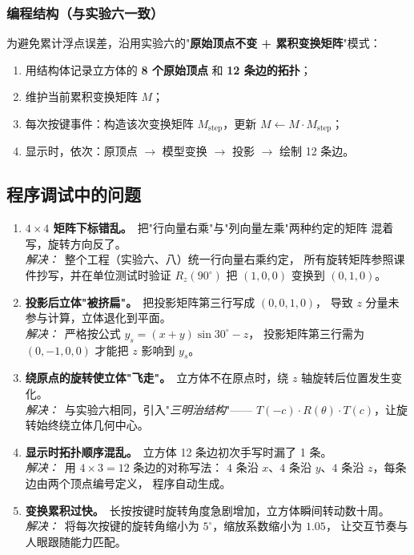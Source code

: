 \documentclass[a4paper,12pt]{ctexart}
\begin{document}
\subsubsection{编程结构（与实验六一致）}

为避免累计浮点误差，沿用实验六的"\textbf{原始顶点不变 + 累积变换矩阵}"模式：

\begin{enumerate}[leftmargin=2em,itemsep=0.2em]
    \item 用结构体记录立方体的 \textbf{8 个原始顶点} 和 \textbf{12 条边的拓扑}；
    \item 维护当前累积变换矩阵 $M$；
    \item 每次按键事件：构造该次变换矩阵 $M_\text{step}$，更新 $M \leftarrow M\cdot M_\text{step}$；
    \item 显示时，依次：原顶点 $\to$ 模型变换 $\to$ 投影 $\to$ 绘制 12 条边。
\end{enumerate}

\subsection{程序调试中的问题}

\begin{enumerate}[leftmargin=2em,itemsep=0.4em]
    \item \textbf{$4\times 4$ 矩阵下标错乱。}\ 把"行向量右乘"与"列向量左乘"两种约定的矩阵
        混着写，旋转方向反了。\\
        \textit{解决：}\ 整个工程（实验六、八）统一行向量右乘约定，
        所有旋转矩阵参照课件抄写，并在单位测试时验证 $R_z(90^\circ)$ 把 $(1,0,0)$
        变换到 $(0,1,0)$。

    \item \textbf{投影后立体"被挤扁"。}\ 把投影矩阵第三行写成 $(0,0,1,0)$，
        导致 $z$ 分量未参与计算，立体退化到平面。\\
        \textit{解决：}\ 严格按公式 $y_s=(x+y)\sin30^\circ - z$，
        投影矩阵第三行需为 $(0,-1,0,0)$ 才能把 $z$ 影响到 $y_s$。

    \item \textbf{绕原点的旋转使立体"飞走"。}\ 立方体不在原点时，绕 $z$ 轴旋转后位置发生变化。\\
        \textit{解决：}\ 与实验六相同，引入"\emph{三明治结构}"——
        $T(-c)\cdot R(\theta)\cdot T(c)$，让旋转始终绕立体几何中心。

    \item \textbf{显示时拓扑顺序混乱。}\ 立方体 12 条边初次手写时漏了 1 条。\\
        \textit{解决：}\ 用 $4\times 3 = 12$ 条边的对称写法：
        $4$ 条沿 $x$、$4$ 条沿 $y$、$4$ 条沿 $z$，每条边由两个顶点编号定义，
        程序自动生成。

    \item \textbf{变换累积过快。}\ 长按按键时旋转角度急剧增加，立方体瞬间转动数十周。\\
        \textit{解决：}\ 将每次按键的旋转角缩小为 $5^\circ$，缩放系数缩小为 $1.05$，
        让交互节奏与人眼跟随能力匹配。
\end{enumerate}
\end{document}
